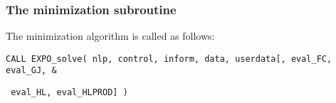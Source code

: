 \documentclass{galahad}
\newcommand{\packagename}{EXPO}
\begin{document}

\subsubsection{The minimization subroutine}
The minimization algorithm is called as follows:
\vspace*{1mm}

\hspace{8mm}
{\tt CALL \packagename\_solve( nlp, control, inform, data, userdata[, eval\_FC,
eval\_GJ, \hspace{8mm}                  \&}
\vspace*{-1mm}

\hspace{37mm}
{\tt
eval\_HL,  eval\_HLPROD] )}
\end{document}
